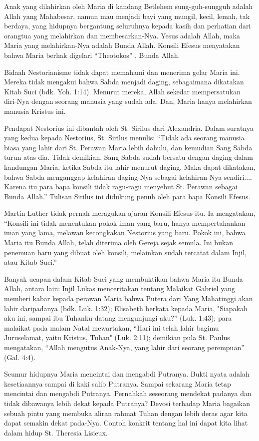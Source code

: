 Anak yang dilahirkan oleh Maria di kandang Betlehem sung-guh-sungguh adalah Allah yang Mahabesar, namun mau menjadi bayi yang mungil, kecil, lemah, tak berdaya, yang hidupnya bergantung seluruhnya kepada kasih dan perhatian dari orangtua yang melahirkan dan membesarkan-Nya. Yesus adalah Allah, maka Maria yang melahirkan-Nya adalah Bunda Allah. Konsili Efesus menyatakan bahwa Maria berhak digelari ``Theotokos'' , Bunda Allah.

Bidaah Nestorianisme tidak dapat memahami dan menerima gelar Maria ini. Mereka tidak mengakui bahwa Sabda menjadi daging, sebagaimana dikatakan Kitab Suci (bdk. Yoh. 1:14). Menurut mereka, Allah sekedar mempersatukan diri-Nya dengan seorang manusia yang sudah ada. Dan, Maria hanya melahirkan manusia Kristus ini.

Pendapat Nestorius ini dibantah oleh St. Sirilus dari Alexandria. Dalam suratnya yang kedua kepada Nestorius, St. Sirilus menulis: ``Tidak ada seorang manusia biasa yang lahir dari St. Perawan Maria lebih dahulu, dan kemudian Sang Sabda turun atas dia. Tidak demikian. Sang Sabda sudah bersatu dengan daging dalam kandungan Maria, ketika Sabda itu lahir menurut daging. Maka dapat dikatakan, bahwa Sabda menganggap kelahiran daging-Nya sebagai kelahiran-Nya sendiri.... Karena itu para bapa konsili tidak ragu-ragu menyebut St. Perawan sebagai Bunda Allah.'' Tulisan Sirilus ini didukung penuh oleh para bapa Konsili Efesus.

Martin Luther tidak pernah meragukan ajaran Konsili Efesus itu. Ia mengatakan, ``Konsili ini tidak menentukan pokok iman yang baru, hanya mempertahankan iman yang lama, melawan kecongkakan Nestorius yang baru. Pokok ini, bahwa Maria itu Bunda Allah, telah diterima oleh Gereja sejak semula. Ini bukan penemuan baru yang dibuat oleh konsili, melainkan sudah tercatat dalam Injil, atau Kitab Suci.''

Banyak ucapan dalam Kitab Suci yang membuktikan bahwa Maria itu Bunda Allah, antara lain: Injil Lukas menceritakan tentang Malaikat Gabriel yang memberi kabar kepada perawan Maria bahwa Putera dari Yang Mahatinggi akan lahir daripadanya (bdk. Luk. 1:32); Elisabeth berkata kepada Maria, "Siapakah aku ini, sampai ibu Tuhanku datang mengunjungi aku?'' (Luk. 1:43); para malaikat pada malam Natal mewartakan, ``Hari ini telah lahir bagimu Juruselamat, yaitu Kristus, Tuhan" (Luk. 2:11); demikian pula St. Paulus mengatakan, ``Allah mengutus Anak-Nya, yang lahir dari seorang perempuan'' (Gal. 4:4).

Seumur hidupnya Maria mencintai dan mengabdi Putranya. Bukti nyata adalah kesetiaannya sampai di kaki salib Putranya. Sampai sekarang Maria tetap mencintai dan mengabdi Putranya. Pernahkah seseorang mendekat padanya dan tidak dibawanya lebih dekat kepada Putranya? Devosi terhadap Maria bagaikan sebuah pintu yang membuka aliran rahmat Tuhan dengan lebih deras agar kita dapat semakin dekat pada-Nya. Contoh konkrit tentang hal ini dapat kita lihat dalam hidup St. Theresia Lisieux.

